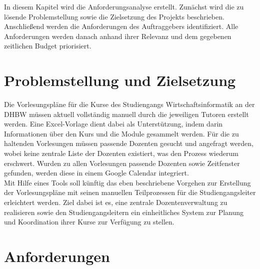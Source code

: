 
In diesem Kapitel wird die Anforderungsanalyse erstellt. Zunächst wird die zu lösende
Problemstellung sowie die Zielsetzung des Projekts beschrieben. Anschließend werden die Anforderungen des Auftraggebers identifiziert. Alle Anforderungen werden danach anhand ihrer Relevanz und dem gegebenen zeitlichen Budget priorisiert.


\section{Problemstellung und Zielsetzung}\label{sec:probl}

Die Vorlesungspläne für die Kurse des Studiengangs Wirtschaftsinformatik an der DHBW müssen aktuell vollständig manuell durch die jeweiligen Tutoren erstellt werden. Eine Excel-Vorlage dient dabei als Unterstützung, indem darin Informationen über den Kurs und die Module gesammelt werden. Für die zu haltenden Vorlesungen müssen passende Dozenten gesucht und angefragt werden, wobei keine zentrale Liste der Dozenten existiert, was den Prozess wiederum erschwert. Wurden zu allen Vorlesungen passende Dozenten sowie Zeitfenster gefunden, werden diese in einem Google Calendar integriert. \\

Mit Hilfe eines Tools soll künftig das eben beschriebene Vorgehen zur Erstellung der Vorlesungspläne mit seinen manuellen Teilprozessen für die Studiengangsleiter erleichtert werden. Ziel dabei ist es, eine zentrale Dozentenverwaltung zu realisieren sowie den Studiengangsleitern ein einheitliches System zur Planung und Koordination ihrer Kurse zur Verfügung zu stellen.


\section{Anforderungen}

